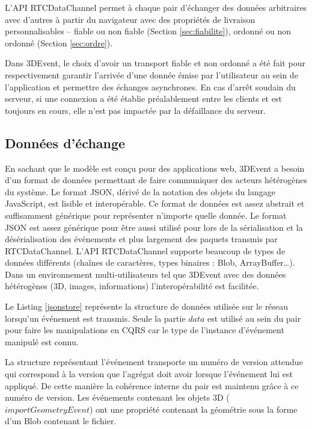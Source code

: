 L'API RTCDataChannel permet à chaque pair d'échanger des données arbitraires 
avec d'autres à partir du navigateur avec des propriétés de livraison 
personnalisables -- fiable ou non fiable (Section \ref{sec:fiabilite}), ordonné ou non 
ordonné (Section \ref{sec:ordre}). 

Dans 3DEvent, le choix d'avoir un transport 
fiable et non ordonné a été fait pour respectivement 
garantir l'arrivée d'une donnée émise par l'utilisateur au sein de l'application et 
permettre des échanges asynchrones.
En cas d'arrêt soudain du serveur, si une connexion a été établie préalablement 
entre les clients et est toujours en cours, elle n'est pas impactée par la défaillance 
du serveur.

\subsection{Données d'échange}
En sachant que le modèle est conçu pour des applications web, 3DEvent a besoin 
d'un format de données permettant de faire communiquer des acteurs hétérogènes 
du système. Le format \gls{JSON}, dérivé de la notation des objets du langage 
JavaScript, est lisible et interopérable.
Ce format de données est assez abstrait et suffisamment générique pour 
représenter n'importe quelle donnée. 
Le format \gls{JSON} est assez générique pour être aussi utilisé pour lors de la 
sérialisation et la désérialisation des 
événements et plus largement des paquets transmis par RTCDataChannel. 
L'\acrshort{API} RTCDataChannel supporte beaucoup de types de données 
différents (chaînes de caractères, types binaires : Blob, ArrayBuffer\dots). Dans 
un environnement multi-utilisateurs tel que 3DEvent avec des données 
hétérogènes (3D, images, 
informations) l'interopérabilité est facilitée.

Le Listing  \ref{jsonstore} représente la structure de données utilisée sur le réseau 
lorsqu'un événement est transmis. Seule la partie $data$ est utilisé au sein du pair 
pour faire les manipulations en \gls{CQRS} car le type de l'instance d'événement 
manipulé est connu. 

La structure représentant l'événement transporte un numéro de version \og 
attendue\fg{} 
qui correspond à la version que l'agrégat doit avoir lorsque l'événement lui est 
appliqué. De cette manière la cohérence interne du pair est maintenu grâce à ce 
numéro de version.
Les événements contenant les objets 3D ($importGeometryEvent$) ont une 
propriété contenant la géométrie sous la forme d'un Blob contenant le fichier. 
\\


